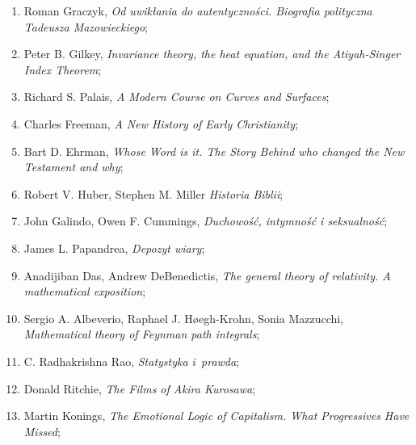 \documentclass[a4paper,11pt]{article}
\begin{document}
\begin{enumerate}
\item Roman Graczyk, \textit{Od uwikłania do autentyczności. Biografia
    polityczna Tadeusza Mazowieckiego};



\item Peter B. Gilkey, \textit{Invariance theory, the heat equation, and
    the Atiyah-Singer Index Theorem};



\item Richard S. Palais, \textit{A Modern Course on Curves and
    Surfaces};



\item Charles Freeman, \textit{A New History of Early Christianity};



\item Bart D. Ehrman, \textit{Whose Word is it. The Story Behind who
    changed the New Testament and why};



\item Robert V. Huber, Stephen M. Miller \textit{Historia Biblii};



\item John Galindo, Owen F. Cummings, \textit{Duchowość, intymność i
    seksualność};



\item James L. Papandrea, \textit{Depozyt wiary};



\item Anadijiban Das, Andrew DeBenedictis, \textit{The general theory of
    relativity. A mathematical exposition};



\item Sergio A. Albeverio, Raphael J. H\o egh-Krohn, Sonia Mazzucchi,
  \textit{Mathematical theory of Feynman path integrals};



\item C. Radhakrishna Rao, \textit{Statystyka i~prawda};



\item Donald Ritchie, \textit{The Films of Akira Kurosawa};



\item Martin Konings, \textit{The Emotional Logic of Capitalism. What
    Progressives Have Missed};




\end{enumerate}
\end{document}
